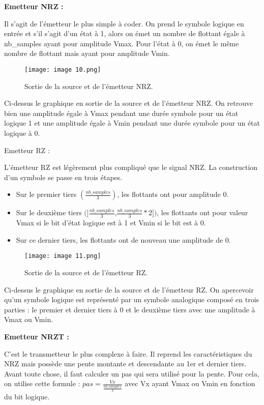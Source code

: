 \textbf{Emetteur NRZ :}

Il s'agit de l'émetteur le plus simple à coder. On prend le symbole logique en entrée et s'il s'agit d'un état à 1, alors on émet un nombre de flottant égale à nb\_samples ayant pour amplitude Vmax. Pour l'état à 0, on émet le même nombre de flottant mais ayant pour amplitude Vmin.

\begin{figure}[h]
    \centering
    \texttt{[image: image 10.png]}
    \caption{\label{fig:image10}Sortie de la source et de l'émetteur NRZ.}
\end{figure}

Ci-dessus le graphique en sortie de la source et de l'émetteur NRZ. On retrouve bien une amplitude égale à Vmax pendant une durée symbole pour un état logique 1 et une amplitude égale à Vmin pendant une durée symbole pour un état logique à 0.

Emetteur RZ :

L'émetteur RZ est légèrement plus compliqué que le signal NRZ. La construction d'un symbole se passe en trois étapes.

\begin{itemize}
    \item Sur le premier tiers $(\frac{nb\_samples}{3})$, les flottants ont pour amplitude 0.
    \item Sur le deuxième tiers $(]\frac{nb\_samples}{3}$,$\frac{nb\_samples}{3}*2])$, les flottants ont pour valeur Vmax si le bit d'état logique est à 1 et Vmin si le bit est à 0.
    \item Sur ce dernier tiers, les flottants ont de nouveau une amplitude de 0.
\end{itemize}

\begin{figure}[h]
    \centering
    \texttt{[image: image 11.png]}
    \caption{\label{fig:image11}Sortie de la source et de l'émetteur RZ.}
\end{figure}

Ci-dessus le graphique en sortie de la source et de l'émetteur RZ. On apercevoir qu'un symbole logique est représenté par un symbole analogique composé en trois parties : le premier et dernier tiers à 0 et le deuxième tiers avec une amplitude à Vmax ou Vmin.

\textbf{Emetteur NRZT :}

C'est le transmetteur le plus complexe à faire. Il reprend les caractéristiques du NRZ mais possède une pente montante et descendante au 1er et dernier tiers. Avant toute chose, il faut calculer un pas qui sera utilisé pour la pente. Pour cela, on utilise cette formule : $ pas = \frac{Vx}{\frac{nb\_samples}{3}} $ avec Vx ayant Vmax ou Vmin en fonction du bit logique.

